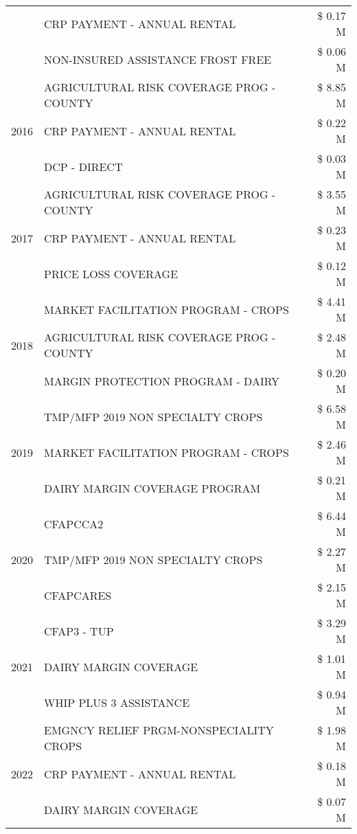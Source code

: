 \begin{tabular}{llr}
 & CRP PAYMENT - ANNUAL RENTAL & \$ 0.17 M \\
 & NON-INSURED ASSISTANCE FROST FREE & \$ 0.06 M \\
\cline{1-3}
\multirow[t]{3}{*}{2016} & AGRICULTURAL RISK COVERAGE PROG - COUNTY & \$ 8.85 M \\
 & CRP PAYMENT - ANNUAL RENTAL & \$ 0.22 M \\
 & DCP - DIRECT & \$ 0.03 M \\
\cline{1-3}
\multirow[t]{3}{*}{2017} & AGRICULTURAL RISK COVERAGE PROG - COUNTY & \$ 3.55 M \\
 & CRP PAYMENT - ANNUAL RENTAL & \$ 0.23 M \\
 & PRICE LOSS COVERAGE & \$ 0.12 M \\
\cline{1-3}
\multirow[t]{3}{*}{2018} & MARKET FACILITATION PROGRAM - CROPS & \$ 4.41 M \\
 & AGRICULTURAL RISK COVERAGE PROG - COUNTY & \$ 2.48 M \\
 & MARGIN PROTECTION PROGRAM - DAIRY & \$ 0.20 M \\
\cline{1-3}
\multirow[t]{3}{*}{2019} & TMP/MFP 2019 NON SPECIALTY CROPS & \$ 6.58 M \\
 & MARKET FACILITATION PROGRAM - CROPS & \$ 2.46 M \\
 & DAIRY MARGIN COVERAGE PROGRAM & \$ 0.21 M \\
\cline{1-3}
\multirow[t]{3}{*}{2020} & CFAPCCA2 & \$ 6.44 M \\
 & TMP/MFP 2019 NON SPECIALTY CROPS & \$ 2.27 M \\
 & CFAPCARES & \$ 2.15 M \\
\cline{1-3}
\multirow[t]{3}{*}{2021} & CFAP3 - TUP & \$ 3.29 M \\
 & DAIRY MARGIN COVERAGE & \$ 1.01 M \\
 & WHIP PLUS 3 ASSISTANCE & \$ 0.94 M \\
\cline{1-3}
\multirow[t]{3}{*}{2022} & EMGNCY RELIEF PRGM-NONSPECIALITY CROPS & \$ 1.98 M \\
 & CRP PAYMENT - ANNUAL RENTAL & \$ 0.18 M \\
 & DAIRY MARGIN COVERAGE & \$ 0.07 M \\
\cline{1-3}
\bottomrule
\end{tabular}
